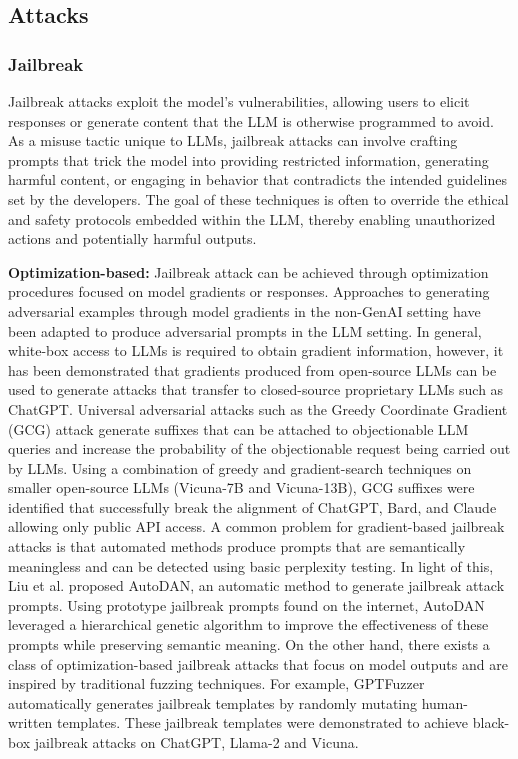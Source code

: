 \subsection{Attacks}

\subsubsection{Jailbreak} 

Jailbreak attacks exploit the model's vulnerabilities, allowing users to elicit responses or generate content that the LLM is otherwise programmed to avoid. As a misuse tactic unique to LLMs, jailbreak attacks can involve crafting prompts that trick the model into providing restricted information, generating harmful content, or engaging in behavior that contradicts the intended guidelines set by the developers. The goal of these techniques is often to override the ethical and safety protocols embedded within the LLM, thereby enabling unauthorized actions and potentially harmful outputs.

\smallskip
\noindent
{\bf Optimization-based:} Jailbreak attack can be achieved through optimization procedures focused on model gradients or responses. Approaches to generating adversarial examples \cite{goodfellow_2015a} through model gradients in the non-GenAI setting have been adapted to produce adversarial prompts in the LLM setting. In general, white-box access to LLMs is required to obtain gradient information, however, it has been demonstrated that gradients produced from open-source LLMs can be used to generate attacks that transfer to closed-source proprietary LLMs such as ChatGPT.
Universal adversarial attacks such as the Greedy Coordinate Gradient (GCG) \cite{zou_2023a} attack generate suffixes that can be attached to objectionable LLM queries and increase the probability of the objectionable request being carried out by LLMs. Using a combination of greedy and gradient-search techniques on smaller open-source LLMs (Vicuna-7B and Vicuna-13B), GCG suffixes were identified that successfully break the alignment of ChatGPT, Bard, and Claude allowing only public API access. A common problem for gradient-based jailbreak attacks is that automated methods produce prompts that are semantically meaningless and can be detected using basic perplexity testing. In light of this, Liu et al. \cite{liu_2024b} proposed AutoDAN, an automatic method to generate jailbreak attack prompts. Using prototype jailbreak prompts found on the internet, AutoDAN leveraged a hierarchical genetic algorithm to improve the effectiveness of these prompts while preserving semantic meaning. On the other hand, there exists a class of optimization-based jailbreak attacks that focus on model outputs and are inspired by traditional fuzzing techniques. For example, GPTFuzzer \cite{yu_2023a} automatically generates jailbreak templates by randomly mutating human-written templates. These jailbreak templates were demonstrated to achieve black-box jailbreak attacks on ChatGPT, Llama-2 and Vicuna.

